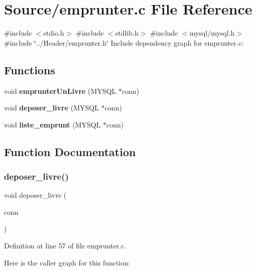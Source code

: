 \section{Source/emprunter.c File Reference}
\label{emprunter_8c}
{\ttfamily \#include $<$stdio.\+h$>$}\newline
{\ttfamily \#include $<$stdlib.\+h$>$}\newline
{\ttfamily \#include $<$mysql/mysql.\+h$>$}\newline
{\ttfamily \#include \char`\"{}../\+Header/emprunter.\+h\char`\"{}}\newline
Include dependency graph for emprunter.\+c\+:
\subsection*{Functions}
\begin{DoxyCompactItemize}
\item 
void \textbf{ emprunter\+Un\+Livre} (M\+Y\+S\+QL $\ast$conn)
\item 
void \textbf{ deposer\+\_\+livre} (M\+Y\+S\+QL $\ast$conn)
\item 
void \textbf{ liste\+\_\+emprunt} (M\+Y\+S\+QL $\ast$conn)
\end{DoxyCompactItemize}


\subsection{Function Documentation}
\mbox{\label{emprunter_8c_a681dc4003fbc86be8328f7539f821614}} 
\subsubsection{deposer\+\_\+livre()}
{\footnotesize\ttfamily void deposer\+\_\+livre (\begin{DoxyParamCaption}\item[{M\+Y\+S\+QL $\ast$}]{conn }\end{DoxyParamCaption})}



Definition at line 57 of file emprunter.\+c.

Here is the caller graph for this function\+:
\mbox{\label{emprunter_8c_a0ad6d357ae8f1a1fbaa0c89045bb0a44}} 
